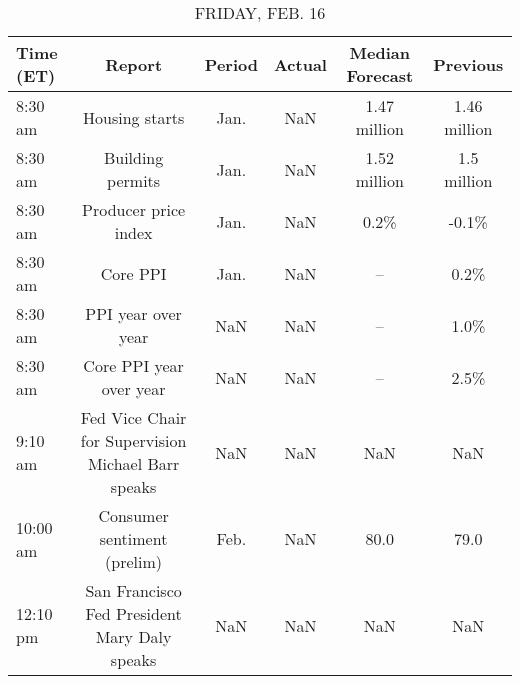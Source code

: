 \documentclass{article}%
\begin{document}
\begin{table}[htbp]%
\caption{FRIDAY, FEB. 16}%
\centering%
\begin{adjustbox}{width=1\textwidth}%
\begin{tabular}{lccccc}
\toprule
Time (ET) &                                             Report & Period & Actual & Median Forecast &     Previous \\
\midrule
  8:30 am &                                     Housing starts &   Jan. &    NaN &    1.47 million & 1.46 million \\
  8:30 am &                                   Building permits &   Jan. &    NaN &    1.52 million &  1.5 million \\
  8:30 am &                               Producer price index &   Jan. &    NaN &            0.2\% &        -0.1\% \\
  8:30 am &                                           Core PPI &   Jan. &    NaN &              -- &         0.2\% \\
  8:30 am &                                 PPI year over year &    NaN &    NaN &              -- &         1.0\% \\
  8:30 am &                            Core PPI year over year &    NaN &    NaN &              -- &         2.5\% \\
  9:10 am & Fed Vice Chair for Supervision Michael Barr speaks &    NaN &    NaN &             NaN &          NaN \\
 10:00 am &                        Consumer sentiment (prelim) &   Feb. &    NaN &            80.0 &         79.0 \\
 12:10 pm &       San Francisco Fed President Mary Daly speaks &    NaN &    NaN &             NaN &          NaN \\
\bottomrule
\end{tabular}
%
\end{adjustbox}%
\end{table}
\end{document}
